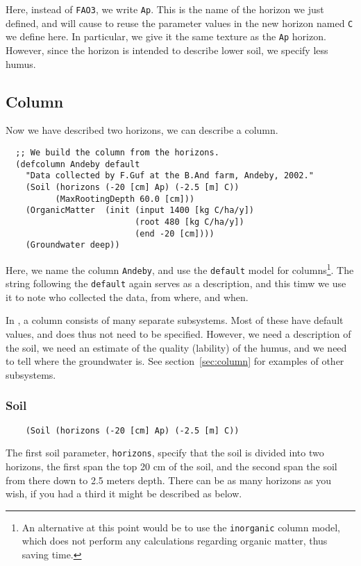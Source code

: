 \documentclass[a4paper,11pt]{article}
\begin{document}
Here, instead of \texttt{FAO3}, we write \texttt{Ap}.  This is the
name of the horizon we just defined, and will cause \daisy{} to reuse
the parameter values in the new horizon named \texttt{C} we define
here.  In particular, we give it the same texture as the \texttt{Ap}
horizon.  However, since the horizon is intended to describe lower
soil, we specify less humus.

\subsection{Column}
\label{ex:column}

Now we have described two horizons, we can describe a column.

\begin{verbatim}
  ;; We build the column from the horizons.
  (defcolumn Andeby default
    "Data collected by F.Guf at the B.And farm, Andeby, 2002."
    (Soil (horizons (-20 [cm] Ap) (-2.5 [m] C))
          (MaxRootingDepth 60.0 [cm]))
    (OrganicMatter  (init (input 1400 [kg C/ha/y])
                          (root 480 [kg C/ha/y])
                          (end -20 [cm])))
    (Groundwater deep))
\end{verbatim}

Here, we name the column \texttt{Andeby}, and use the \texttt{default}
model for \daisy{} columns\footnote{An alternative at this point would
  be to use the \texttt{inorganic} column model, which does not
  perform any calculations regarding organic matter, thus saving
  time.}.  The string following the \texttt{default} again serves as a
description, and this timw we use it to note who collected the data,
from where, and when.

In \daisy{}, a column consists of many separate subsystems.  Most of
these have default values, and does thus not need to be specified.
However, we need a description of the soil, we need an estimate of the
quality (lability) of the humus, and we need to tell \daisy{} where
the groundwater is.  See section~\ref{sec:column} for examples of
other subsystems.

\subsubsection{Soil}
\label{ex:soil}

\begin{verbatim}
    (Soil (horizons (-20 [cm] Ap) (-2.5 [m] C))
\end{verbatim}
The first soil parameter, \texttt{horizons}, specify that the soil is
divided into two horizons, the first span the top 20 cm of the soil,
and the second span the soil from there down to 2.5 meters depth.
There can be as many horizons as you wish, if you had a third it might
be described as below.
\end{document}
